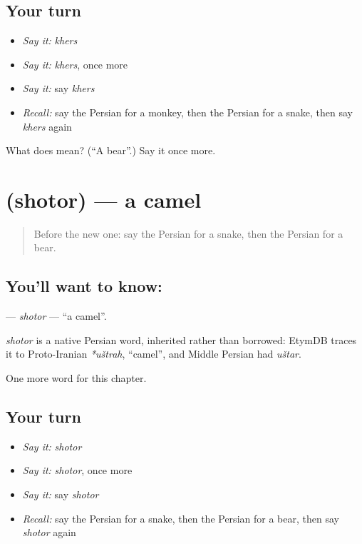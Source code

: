 \subsection*{Your turn}
\begin{itemize}
\raggedright
  \item \emph{Say it:} \emph{khers}
  \item \emph{Say it:} \emph{khers}, once more
  \item \emph{Say it:} say \emph{khers}
  \item \emph{Recall:} say the Persian for a monkey, then the Persian for a snake, then say \emph{khers} again
\end{itemize}

\begin{tcolorbox}[breakable,colback=teal!4,colframe=teal!35!black,title={Before you move on}]
What does  mean? (\textquotedblleft{}A bear\textquotedblright{}.) Say it once more.
\end{tcolorbox}
\section[\texorpdfstring{\fa{شتر} (shotor)}{شتر (shotor)}]{ (shotor) — a camel}

\label{lesson:FA-C57-shotor}



\begin{quote}
Before the new one: say the Persian for a snake, then the Persian for a bear.
\end{quote}

\subsection*{You'll want to know: }
\textbf{} — \emph{shotor} — \textquotedblleft{}a camel\textquotedblright{}.

\begin{cousinweb}
\emph{shotor} is a native Persian word, inherited rather than borrowed: EtymDB traces it to Proto-Iranian \emph{*uštrah}, \textquotedblleft{}camel\textquotedblright{}, and Middle Persian had \emph{uštar}.
\end{cousinweb}

\begin{grammarlens}[title={What you've built}]
One more word for this chapter.
\end{grammarlens}

\subsection*{Your turn}
\begin{itemize}
\raggedright
  \item \emph{Say it:} \emph{shotor}
  \item \emph{Say it:} \emph{shotor}, once more
  \item \emph{Say it:} say \emph{shotor}
  \item \emph{Recall:} say the Persian for a snake, then the Persian for a bear, then say \emph{shotor} again
\end{itemize}


